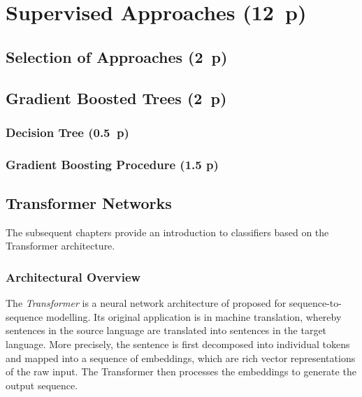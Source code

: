 \newpage
\section{Supervised Approaches (12~p)}\label{sec:supervised-approaches}

\subsection{Selection of Approaches (2~p)}\label{sec:selection-of-approaches}

\subsection{Gradient Boosted Trees (2~p)}\label{sec:gradient-boosted-trees}

\subsubsection{Decision Tree (0.5~p)}\label{sec:decision-tree}

\subsubsection{Gradient Boosting
  Procedure (1.5 p)}\label{sec:gradient-boosting-procedure}

\subsection{Transformer Networks}\label{sec:transformer-networks}

The subsequent chapters provide an introduction to classifiers based on the Transformer architecture.

\subsubsection{Architectural Overview}\label{sec:architectural-overview}

The \emph{Transformer} is a neural network architecture of \textcite[][6002--6006]{vaswaniAttentionAllYou2017} proposed for sequence-to-sequence modelling. Its original application is in machine translation, whereby sentences in the source language are translated into sentences in the target language. More precisely, the sentence is first decomposed into individual \glspl{token} and mapped into a sequence of \glspl{embedding}, which are rich vector representations of the raw input. The Transformer then processes the \glspl{embedding} to generate the output sequence.


